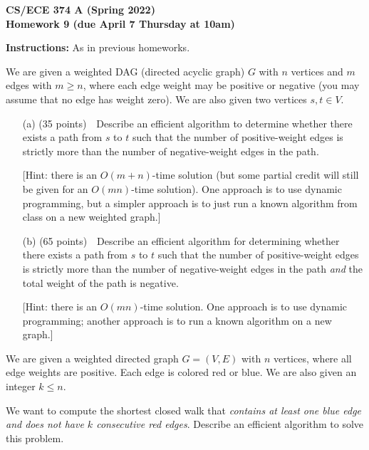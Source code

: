 \documentclass[11pt]{article}
\begin{document}
\begin{center}\Large\bf 
CS/ECE 374 A (Spring 2022)\\
{\Large Homework 9} (due April 7 Thursday at 10am)
\end{center}

\medskip
\noindent
{\bf Instructions:} As in previous homeworks.  


\begin{description}
\bigskip
\item[Problem 9.1:] 
We are given a weighted DAG (directed acyclic graph) $G$ with $n$ vertices and $m$ edges with $m\ge n$,
where each edge weight may be positive or negative (you may assume that no edge has weight zero).  We are also given two vertices $s,t\in V$.

\begin{enumerate}
\item[(a)] (35 points)\ \ Describe an efficient algorithm to determine whether there exists a path from $s$ to $t$ such that the number of positive-weight edges is strictly more than the number of negative-weight edges in the path.

[Hint: there is an $O(m+n)$-time solution (but some partial credit will still be given for an $O(mn)$-time solution).  One approach is to use dynamic programming, but a simpler approach is to just run a known algorithm from class on a new weighted graph.]

\smallskip
\item[(b)] (65 points)\ \ Describe an efficient algorithm for determining whether there exists a path from $s$ to $t$ such that the number of positive-weight edges is strictly more than the number of negative-weight edges in the path \emph{and} the total weight of the path is negative.

[Hint: there is an $O(mn)$-time solution.  One approach is to use dynamic programming; another approach is to run a known algorithm on a new graph.]
\end{enumerate}



\bigskip
\item[Problem 9.2:]
We are given a weighted directed graph $G=(V,E)$ with $n$ vertices, where all edge weights are positive.
Each edge is colored red or blue.
We are also given an integer $k\le n$.

We want to compute the shortest closed walk that \emph{contains at least one blue edge and does not have $k$ consecutive red edges}.  
Describe an efficient algorithm to solve this problem.


\end{description}
\end{document}
